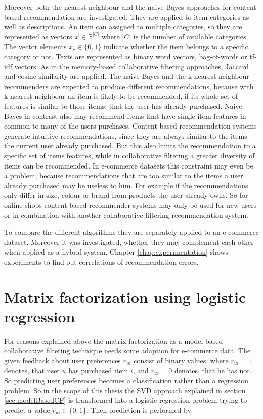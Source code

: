 \documentclass[10pt]{reportMaster}
\begin{document}
Moreover both the nearest-neighbour and the naive Bayes approaches for content-based recommendation are investigated.
They are applied to item categories as well as descriptions.
An item can assigned to multiple categories, so they are represented as vectors $\vec{x} \in \mathds{R}^{|C|}$ where $|C|$ is the number of available categories.
The vector elements $x_c \in \{0,1\}$ indicate whether the item belongs to a specific category or not. 
Texts are represented as binary word vectors, bag-of-words or tf-idf vectors.
As in the memory-based collaborative filtering approaches, Jaccard and cosine similarity are applied.
The naive Bayes and the k-nearest-neighbour recommenders are expected to produce different recommendations, because with k-nearest-neighbour an item is likely to be recommended, if its whole set of features is similar to those items, that the user has already purchased.
Naive Bayes in contrast also may recommend items that have single item features in common to many of the users purchases.
Content-based recommendation systems generate intuitive recommendations, since they are always similar to the items the current user already purchased.
But this also limits the recommendation to a specific set of items features, while in collaborative filtering a greater diversity of items can be recommended.
In e-commerce datasets this constraint may even be a problem, because recommendations that are too similar to the items a user already purchased may be useless to him.
For example if the recommendations only differ in size, colour or brand from products the user already owns.
So for online shops content-based recommender systems may only be used for new users or in combination with another collaborative filtering recommendation system. %

To compare the different algorithms they are separately applied to an e-commerce dataset.
Moreover it was investigated, whether they may complement each other when applied as a hybrid system.
Chapter \ref{chap:experimentation} shows experiments to find out correlations of recommendation errors.


\section{Matrix factorization using logistic regression}
\label{sec:logRegSVD}

For reasons explained above the matrix factorization as a model-based collaborative filtering technique needs some adaption for e-commerce data.
The given feedback about user preferences $r_{ui}$ consist of binary values, where $r_{ui} = 1$ denotes, that user $u$ has purchased item $i$, and $r_{ui} = 0$ denotes, that he has not.
So predicting user preferences becomes a classification rather than a regression problem.
So in the scope of this thesis the SVD approach explained in section \ref{sec:modelBasedCF} is transformed into a logistic regression problem trying to predict a value $\hat{r}_{ui} \in \{0,1\}$.
Then prediction is performed by 
\end{document}
